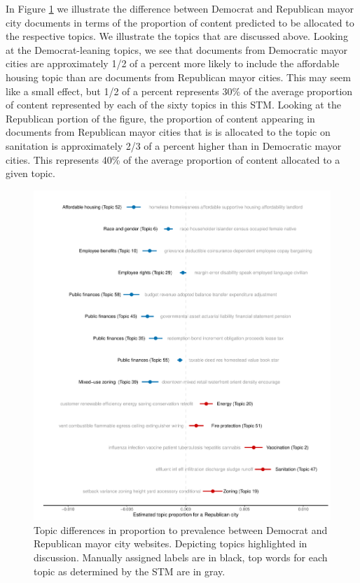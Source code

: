 \documentclass[11pt]{article}
\begin{document}
In Figure \ref{fig:demreptop} we illustrate the difference between Democrat and Republican mayor city documents in terms of the proportion of content predicted to be allocated to the respective topics. We illustrate the topics that are discussed above.  Looking at the Democrat-leaning topics, we see that documents from Democratic mayor cities are approximately 1/2 of a percent more likely to include the affordable housing topic than are documents from Republican mayor cities. This may seem like a small effect, but 1/2 of a percent represents 30\% of the average proportion of content represented by each of the sixty topics in this STM. Looking at the Republican portion of the figure, the proportion of content appearing in documents from Republican mayor cities that is is allocated to the topic on sanitation is approximately 2/3 of a percent higher than in Democratic mayor cities. This represents 40\% of the average proportion of content allocated to a given topic.  

\begin{figure}
\centering
\includegraphics[scale=0.725]{figures/Democratic_Republican_topics}
\caption{Topic differences in proportion to prevalence between Democrat and Republican mayor city websites. Depicting topics highlighted in discussion. Manually assigned labels are in black, top words for each topic as determined by the STM are in gray.} \vspace{-.3cm}
\label{fig:demreptop}
\end{figure}
\end{document}
